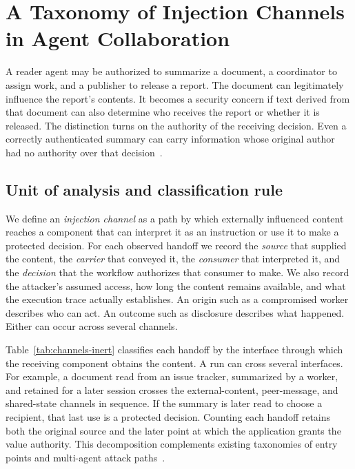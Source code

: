 \documentclass[11pt]{article}
\begin{document}
\fi
\section{A Taxonomy of Injection Channels in Agent Collaboration}\label{sec:taxonomy}

A reader agent may be authorized to summarize a document, a coordinator to assign work, and a publisher to release a report. The document can legitimately influence the report's contents. It becomes a security concern if text derived from that document can also determine who receives the report or whether it is released. The distinction turns on the authority of the receiving decision. Even a correctly authenticated summary can carry information whose original author had no authority over that decision~\citep{greshake2023indirect,triedman2025mas,debenedetti2025camel}.

\subsection{Unit of analysis and classification rule}

We define an \emph{injection channel} as a path by which externally influenced content reaches a component that can interpret it as an instruction or use it to make a protected decision. For each observed handoff we record the \emph{source} that supplied the content, the \emph{carrier} that conveyed it, the \emph{consumer} that interpreted it, and the \emph{decision} that the workflow authorizes that consumer to make. We also record the attacker's assumed access, how long the content remains available, and what the execution trace actually establishes. An origin such as a compromised worker describes who can act. An outcome such as disclosure describes what happened. Either can occur across several channels.

Table~\ref{tab:channels-inert} classifies each handoff by the interface through which the receiving component obtains the content. A run can cross several interfaces. For example, a document read from an issue tracker, summarized by a worker, and retained for a later session crosses the external-content, peer-message, and shared-state channels in sequence. If the summary is later read to choose a recipient, that last use is a protected decision. Counting each handoff retains both the original source and the later point at which the application grants the value authority. This decomposition complements existing taxonomies of entry points and multi-agent attack paths~\citep{Mitra2026WhereREC,Yang2026SoKWSJ,Paul2026BeyondSIE}.
\end{document}
